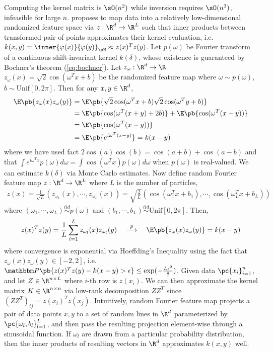 \documentclass[11pt]{article}
\begin{document}
Computing the kernel matrix is $\sO(n^2)$ while inversion requires $\sO(n^3)$, infeasible for large $n$. \cite{rahimiRandomFeaturesLargeScale2007} proposes to map data into a relatively low-dimensional randomized feature space via $z:\R^d\to\R^L$ such that inner products between transformed pair of points approximates their kernel evaluation, i.e. $k(x,y) = \inner{\varphi(x)}{\varphi(y)}_{\sH} \approx z(x)^Tz(y)$. Let $p(\omega)$ be Fourier transform of a continuous shift-invariant kernel $k(\delta)$, whose existence is guaranteed by Bochner's theorem (\ref{eq:bochner}). Let $z_{\omega}:\R^d\to \R$ $z_{\omega}(x) = \sqrt{2}\cos(\omega^Tx+b)$ be the randomized feature map where $\omega\sim p(\omega)$, $b\sim \text{Unif}[0,2\pi]$. Then for any $x,y\in\R^d$,
\begin{align*}
    \E\pb{z_{\omega}(x)z_{\omega}(y)}
        &= \E\pb{ \sqrt{2} \cos(\omega^T x + b) \sqrt{2}\cos(\omega^Ty+b) } \\
        &= \E\pb{ \cos(\omega^T(x+y)+2b) } + \E\pb{ \cos(\omega^T(x-y)) } \\
        &= \E\pb{ \cos(\omega^T(x-y)) } \\
        &= \E\pb{ e^{i\omega^T(x-y)} } = k(x-y)
\end{align*}
where we have used fact $2\cos(a)\cos(b)=\cos(a+b)+\cos(a-b)$ and that $\int e^{i\omega^Tx} p(\omega)d\omega = \int \cos(\omega^Tx) p(\omega)d\omega$ when $p(\omega)$ is real-valued. We can estimate $k(\delta)$ via Monte Carlo estimates. Now define random Fourier feature map $z:\R^d\to\R^L$ where $L$ is the number of particles,
\begin{align}
    z(x)
        = \frac{1}{\sqrt{L}} (z_{\omega_1}(x), \cdots, z_{\omega_L}(x)) 
        = \sqrt{\frac{2}{L}}(\cos(\omega_1^Tx+b_1), \cdots, \cos(\omega_L^Tx+b_L))
\end{align}
where $(\omega_1,\cdots,\omega_L) \overset{iid}{\sim} p(\omega)$ and $(b_1,\cdots,b_L)\overset{iid}{\sim} \text{Unif}[0,2\pi]$. Then,
\begin{align}
    z(x)^Tz(y)
        = \frac{1}{L} \sum_{l=1}^L z_{\omega_l}(x) z_{\omega_l}(y)
        \quad\overset{p}{\longrightarrow}\quad 
        \E\pb{z_{\omega}(x)z_{\omega}(y)}
        = k(x-y)
\end{align}
where convergence is exponential via Hoeffding's Inequality using the fact that $z_{\omega}(x)z_{\omega}(y) \in [-2,2]$, i.e. $\bbP\pb{ z(x)^Tz(y) - k(x-y) > \epsilon } \leq \exp(-\frac{L\epsilon^2}{8})$. Given data $\pc{x_i}_{i=1}^n$, and let $Z\in\R^{n\times L}$ where $i$-th row is $z(x_i)$. We can then approximate the kernel matrix $K\in\R^{n\times n}$ via low-rank decomposition $ZZ^T$ since $(ZZ^T)_{ij} = z(x_i)^T z(x_j)$. Intuitively, random Fourier feature map projects a pair of data points $x,y$ to a set of random lines in $\R^d$ parameterized by $\pc{\omega_l,b_l}_{l=1}^L$, and then pass the resulting projection element-wise through a sinusoidal function. If $\omega_l$ are drawn from a particular probability distribution, then the inner products of resulting vectors in $\R^d$ approximates $k(x,y)$ well.
\end{document}

